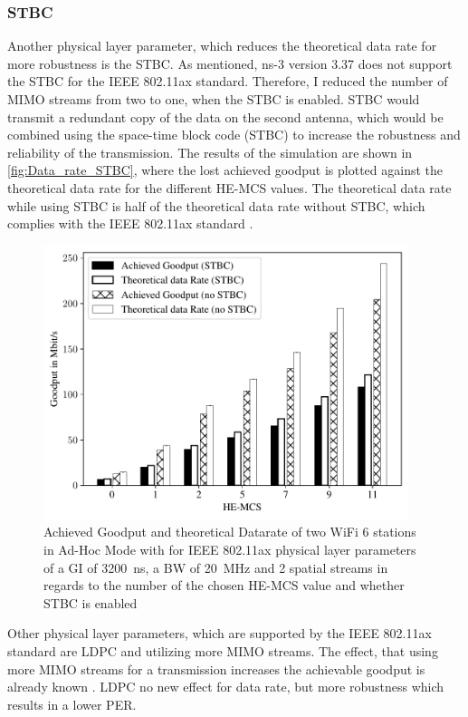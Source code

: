 \subsubsection*{\acf{STBC}}
\label{sec:STBCDataRate}
Another physical layer parameter, which reduces the theoretical data rate for more robustness is the \ac{STBC}.
As mentioned, ns-3 version 3.37 does not support the \ac{STBC} for the IEEE 802.11ax standard.
Therefore, I reduced the number of
\ac{MIMO} streams from two to one, when the \ac{STBC} is enabled. \ac{STBC} would transmit a redundant copy of the data on the second antenna, which would be combined
using the space-time block code (STBC) to increase the robustness and reliability of the transmission.
The results of the simulation are shown in \autoref{fig:Data_rate_STBC}, where the lost achieved goodput is plotted against
the theoretical data rate for the different HE-\ac{MCS} values.
The theoretical data rate while using \ac{STBC} is half of the theoretical data rate without \ac{STBC},
which complies with the IEEE 802.11ax standard \cite{noauthor_ieee_2021}.
\begin{figure}[H]%
	\centering
	\includegraphics[width=0.95\textwidth]{figures/STBC_dataRate_simulation}
	\caption{Achieved Goodput and theoretical Datarate of two WiFi 6 stations in Ad-Hoc Mode with for IEEE 802.11ax physical layer parameters of a \acf{GI} of \SI{3200}{\nano\second}, a \acf{BW} of \SI{20}{\mega\hertz} and 2 spatial streams  in regards to the number of the chosen HE-\acf{MCS} value and whether \acf{STBC} is enabled}%
	\label{fig:Data_rate_STBC}%
\end{figure}

Other physical layer parameters, which are supported by the IEEE 802.11ax standard are \ac{LDPC} and utilizing more \ac{MIMO} streams.
The effect, that using more \ac{MIMO} streams for a transmission increases the achievable goodput
is already known \cite{sauter_wireless_2022, noauthor_ieee_2021, noauthor_ieee_2021-1}.
\ac{LDPC} no new effect for data rate, but more robustness which results in a lower \ac{PER}.

